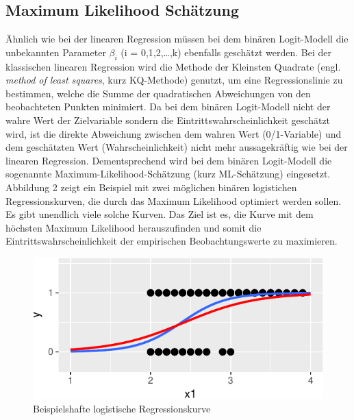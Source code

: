 \documentclass[12pt,]{article}
\begin{document}
\subsection{Maximum Likelihood
Schätzung}\label{maximum-likelihood-schatzung}

Ähnlich wie bei der linearen Regression müssen bei dem binären
Logit-Modell die unbekannten Parameter \(\beta_i\) (i =
0,1,2,\ldots{},k) ebenfalls geschätzt werden. Bei der klassischen
linearen Regression wird die Methode der Kleinsten Quadrate (engl.
\emph{method of least squares}, kurz KQ-Methode) genutzt, um eine
Regressionslinie zu bestimmen, welche die Summe der quadratischen
Abweichungen von den beobachteten Punkten minimiert. Da bei dem binären
Logit-Modell nicht der wahre Wert der Zielvariable sondern die
Eintrittswahrscheinlichkeit geschätzt wird, ist die direkte Abweichung
zwischen dem wahren Wert (0/1-Variable) und dem geschätzten Wert
(Wahrscheinlichkeit) nicht mehr aussagekräftig wie bei der linearen
Regression. Dementsprechend wird bei dem binären Logit-Modell die
sogenannte Maximum-Likelihood-Schätzung (kurz ML-Schätzung) eingesetzt.
Abbildung 2 zeigt ein Beispiel mit zwei möglichen binären logistichen
Regressionskurven, die durch das Maximum Likelihood optimiert werden
sollen. Es gibt unendlich viele solche Kurven. Das Ziel ist es, die
Kurve mit dem höchsten Maximum Likelihood herauszufinden und somit die
Eintrittswahrscheinlichkeit der empirischen Beobachtungswerte zu
maximieren.

\begin{figure}[h]

{\centering \includegraphics{logisticRegression_files/figure-latex/unnamed-chunk-2-1} 

}

\caption{Beispielshafte logistische Regressionskurve}\label{fig:unnamed-chunk-2}
\end{figure}
\end{document}
